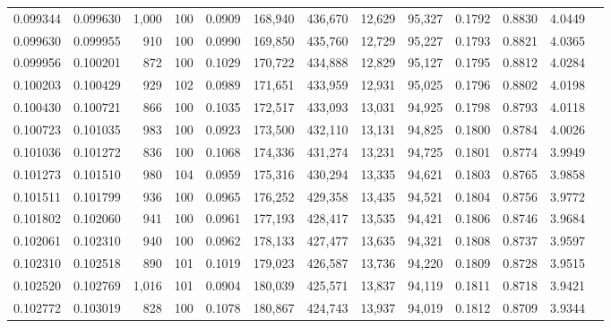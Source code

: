 \begin{tabular}{rrrrrrrrrrrrr}
0.099344 & 0.099630 & 1,000 & 100 &                                     0.0909 & 168,940 & 436,670 &  12,629 &  95,327 & 0.1792 & 0.8830 & 4.0449 \\
0.099630 & 0.099955 &   910 & 100 &                                     0.0990 & 169,850 & 435,760 &  12,729 &  95,227 & 0.1793 & 0.8821 & 4.0365 \\
0.099956 & 0.100201 &   872 & 100 &                                     0.1029 & 170,722 & 434,888 &  12,829 &  95,127 & 0.1795 & 0.8812 & 4.0284 \\
0.100203 & 0.100429 &   929 & 102 &                                     0.0989 & 171,651 & 433,959 &  12,931 &  95,025 & 0.1796 & 0.8802 & 4.0198 \\
0.100430 & 0.100721 &   866 & 100 &                                     0.1035 & 172,517 & 433,093 &  13,031 &  94,925 & 0.1798 & 0.8793 & 4.0118 \\
0.100723 & 0.101035 &   983 & 100 &                                     0.0923 & 173,500 & 432,110 &  13,131 &  94,825 & 0.1800 & 0.8784 & 4.0026 \\
0.101036 & 0.101272 &   836 & 100 &                                     0.1068 & 174,336 & 431,274 &  13,231 &  94,725 & 0.1801 & 0.8774 & 3.9949 \\
0.101273 & 0.101510 &   980 & 104 &                                     0.0959 & 175,316 & 430,294 &  13,335 &  94,621 & 0.1803 & 0.8765 & 3.9858 \\
0.101511 & 0.101799 &   936 & 100 &                                     0.0965 & 176,252 & 429,358 &  13,435 &  94,521 & 0.1804 & 0.8756 & 3.9772 \\
0.101802 & 0.102060 &   941 & 100 &                                     0.0961 & 177,193 & 428,417 &  13,535 &  94,421 & 0.1806 & 0.8746 & 3.9684 \\
0.102061 & 0.102310 &   940 & 100 &                                     0.0962 & 178,133 & 427,477 &  13,635 &  94,321 & 0.1808 & 0.8737 & 3.9597 \\
0.102310 & 0.102518 &   890 & 101 &                                     0.1019 & 179,023 & 426,587 &  13,736 &  94,220 & 0.1809 & 0.8728 & 3.9515 \\
0.102520 & 0.102769 & 1,016 & 101 &                                     0.0904 & 180,039 & 425,571 &  13,837 &  94,119 & 0.1811 & 0.8718 & 3.9421 \\
0.102772 & 0.103019 &   828 & 100 &                                     0.1078 & 180,867 & 424,743 &  13,937 &  94,019 & 0.1812 & 0.8709 & 3.9344 \\

\end{tabular}
